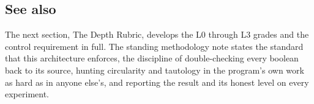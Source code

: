 \subsection{See also}

The next section, The Depth Rubric, develops the L0 through L3 grades and the control requirement in full. The standing methodology note states the standard that this architecture enforces, the discipline of double-checking every boolean back to its source, hunting circularity and tautology in the program's own work as hard as in anyone else's, and reporting the result and its honest level on every experiment.
